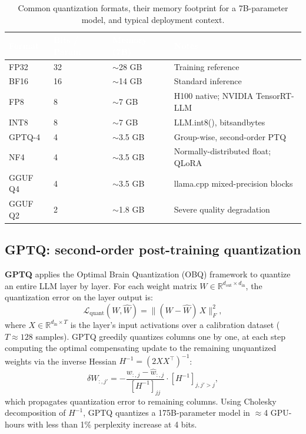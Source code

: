 \documentclass[11pt,a4paper]{article}
\begin{document}
	\begin{table}[ht]
		\centering
		\small\sffamily
		\renewcommand{\arraystretch}{1.3}
		\begin{tabular}{@{}L{2.5cm} L{2.5cm} L{2.8cm} L{5cm}@{}}
			\toprule
			\textcolor{white}{\textbf{Format}} &
			\textcolor{white}{\textbf{Bits / Param}} &
			\textcolor{white}{\textbf{Memory (7B)}} &
			\textcolor{white}{\textbf{Notes}} \\
			\midrule
			FP32    & 32 & $\sim$28 GB & Training reference \\
			BF16    & 16 & $\sim$14 GB & Standard inference \\
			FP8     & 8  & $\sim$7 GB  & H100 native; NVIDIA TensorRT-LLM \\
			INT8    & 8  & $\sim$7 GB  & LLM.int8(), bitsandbytes \\
			GPTQ-4  & 4  & $\sim$3.5 GB & Group-wise, second-order PTQ \\
			NF4     & 4  & $\sim$3.5 GB & Normally-distributed float; QLoRA \\
			GGUF Q4 & 4  & $\sim$3.5 GB & llama.cpp mixed-precision blocks \\
			GGUF Q2 & 2  & $\sim$1.8 GB & Severe quality degradation \\
			\bottomrule
		\end{tabular}
		\caption{Common quantization formats, their memory footprint for a 7B-parameter model, and typical deployment context.}
		\label{tab:quant_formats}
	\end{table}

	\subsection{GPTQ: second-order post-training quantization}

	\textbf{GPTQ} \parencite{frantar2022gptq} applies the Optimal Brain Quantization (OBQ) framework to quantize an entire LLM layer by layer. For each weight matrix $W \in \mathbb{R}^{d_{\mathrm{out}} \times d_{\mathrm{in}}}$, the quantization error on the layer output is:
	\begin{equation}
		\mathcal{L}_{\mathrm{quant}}(W, \hat{W}) = \bigl\|(W - \hat{W})\,X\bigr\|_F^2,
	\end{equation}
	where $X \in \mathbb{R}^{d_{\mathrm{in}} \times T}$ is the layer's input activations over a calibration dataset ($T \approx 128$ samples). GPTQ greedily quantizes columns one by one, at each step computing the optimal compensating update to the remaining unquantized weights via the inverse Hessian $H^{-1} = (2XX^\top)^{-1}$:
	\begin{equation}
		\delta W_{:,j'} = -\frac{w_{:,j} - \hat{w}_{:,j}}{[H^{-1}]_{jj}} \cdot [H^{-1}]_{j, j'>j},
	\end{equation}
	which propagates quantization error to remaining columns. Using Cholesky decomposition of $H^{-1}$, GPTQ quantizes a 175B-parameter model in $\approx$4 GPU-hours with less than 1\% perplexity increase at 4 bits.
\end{document}
